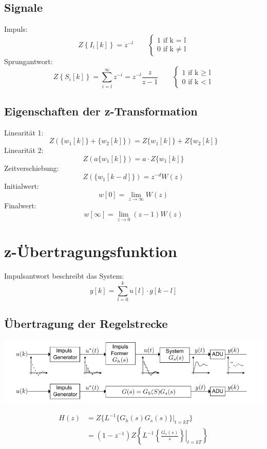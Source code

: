 \subsection{Signale}
Impuls:
\[
	Z\left\lbrace I_i[k]\right\rbrace  =z^{-l} \qquad \begin{cases}\textrm{1 if k $=$ l}\\\textrm{0 if k $\neq$ l}\end{cases}
\]
Sprungantwort:
\[
	Z\left\lbrace S_i[k]\right\rbrace  =\sum_{i=l}^{\infty}z^{-i}=z^{-l}\frac{z}{z-1} \qquad \begin{cases}\textrm{1 if k $\geq$ l}\\\textrm{0 if k $<$ l}\end{cases}
\]

\subsection{Eigenschaften der z-Transformation}
Linearität 1:
\[
	Z(\{w_1[k]\}+\{w_2[k]\}) = Z\{w_1[k]\} + Z\{w_2[k]\}
\]
Linearität 2:
\[
	Z(a\{w_1[k]\}) = a \cdot Z\{w_1[k]\}
\]
Zeitverschiebung:
\[
	Z(\{w_1[k-d]\}) = z^{-d}W(z)
\]
Initialwert:
\[
	w[0] = \lim\limits_{z\rightarrow\infty}W(z)
\]
Finalwert:
\[
	w[\infty] = \lim\limits_{z\rightarrow 0}(z-1)W(z)
\]

\section{z-Übertragungsfunktion}
Impulsantwort beschreibt das System:
\[
	y[k] = \sum_{l=0}^{k}u[l] \cdot g[k-l]
\]

\subsection{Übertragung der Regelstrecke}
\begin{center}
	\includegraphics[width=.8\textwidth]{./images/regelstrecke}
\end{center}

\[\begin{aligned}
	H(z) &= Z\{L^{-1}\{G_h(s)G_s(s)\}|_{t=kT}\} \\
		&= (1-z^{-1})Z\left\lbrace L^{-1}\left.\left\lbrace\frac{G_s(s)}{s}\right\rbrace\right| _{t=kT}\right\rbrace
\end{aligned}\]


